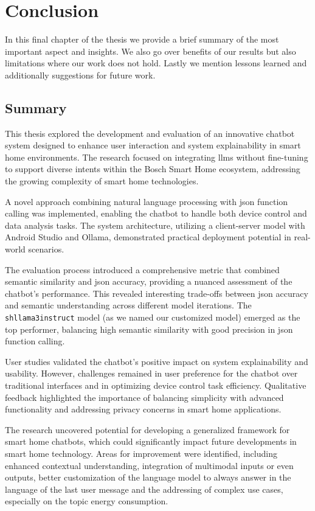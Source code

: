 
\chapter{Conclusion}\label{chap:conclusion}
In this final chapter of the thesis we provide a brief summary of the most important aspect and insights. We also go over benefits of our results but also limitations where our work does not hold. 
Lastly we mention lessons learned and additionally suggestions for future work.

\section{Summary}
This thesis explored the development and evaluation of an innovative chatbot system designed to enhance user interaction and system explainability in smart home environments. The research focused on integrating \glspl{llm} without fine-tuning to support diverse intents within the Bosch Smart Home ecosystem, addressing the growing complexity of smart home technologies.

A novel approach combining natural language processing with \gls{json} function calling was implemented, enabling the chatbot to handle both device control and data analysis tasks. The system architecture, utilizing a client-server model with Android Studio and Ollama, demonstrated practical deployment potential in real-world scenarios.

The evaluation process introduced a comprehensive metric that combined semantic similarity and \gls{json} accuracy, providing a nuanced assessment of the chatbot's performance. This revealed interesting trade-offs between \gls{json} accuracy and semantic understanding across different model iterations. 
The \texttt{shllama3instruct} model (as we named our customized model) emerged as the top performer, balancing high semantic similarity with good precision in \gls{json} function calling.

User studies validated the chatbot's positive impact on system explainability and usability. However, challenges remained in user preference for the chatbot over traditional interfaces and in optimizing device control task efficiency. Qualitative feedback highlighted the importance of balancing simplicity with advanced functionality and addressing privacy concerns in smart home applications.

The research uncovered potential for developing a generalized framework for smart home chatbots, which could significantly impact future developments in smart home technology. Areas for improvement were identified, including enhanced contextual understanding, integration of multimodal inputs or even outputs, better customization of the language model to always answer in the language of the last user message and the addressing of complex use cases, especially on the topic energy consumption.

